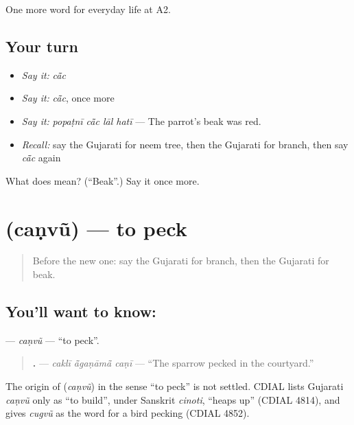 \begin{grammarlens}[title={What you've built}]
One more word for everyday life at A2.
\end{grammarlens}

\subsection*{Your turn}
\begin{itemize}
\raggedright
  \item \emph{Say it:} \emph{cā̃c}
  \item \emph{Say it:} \emph{cā̃c}, once more
  \item \emph{Say it:} \emph{popaṭnī cā̃c lāl hatī} — The parrot's beak was red.
  \item \emph{Recall:} say the Gujarati for neem tree, then the Gujarati for branch, then say \emph{cā̃c} again
\end{itemize}

\begin{tcolorbox}[breakable,colback=teal!4,colframe=teal!35!black,title={Before you move on}]
What does  mean? (\textquotedblleft{}Beak\textquotedblright{}.) Say it once more.
\end{tcolorbox}
\section[\texorpdfstring{\gu{ચણવું} (caṇvũ)}{ચણવું (caṇvũ)}]{ (caṇvũ) — to peck}

\label{lesson:GU-C236-canvu}



\begin{quote}
Before the new one: say the Gujarati for branch, then the Gujarati for beak.
\end{quote}

\subsection*{You'll want to know: }
\textbf{} — \emph{caṇvũ} — \textquotedblleft{}to peck\textquotedblright{}.

\begin{quote}
\textbf{  .} — \emph{caklī ā̃gaṇāmā̃ caṇī} — \textquotedblleft{}The sparrow pecked in the courtyard.\textquotedblright{}
\end{quote}

\begin{cousinweb}
The origin of \textbf{} (\emph{caṇvũ}) in the sense \textquotedblleft{}to peck\textquotedblright{} is not settled. CDIAL lists Gujarati \emph{caṇvũ} only as \textquotedblleft{}to build\textquotedblright{}, under Sanskrit \emph{cinoti}, \textquotedblleft{}heaps up\textquotedblright{} (CDIAL 4814), and gives \emph{cugvũ} as the word for a bird pecking (CDIAL 4852).
\end{cousinweb}

